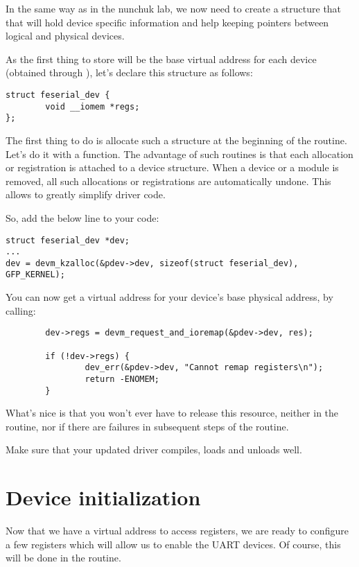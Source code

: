 In the same way as in the nunchuk lab, we now need to create a
structure that that will hold device specific information and help
keeping pointers between logical and physical devices.

As the first thing to store will be the base virtual address for
each device (obtained through ), let's declare this
structure as follows:

\begin{verbatim}
struct feserial_dev {
        void __iomem *regs;
};
\end{verbatim}

The first thing to do is allocate such a structure at the beginning
of the  routine. Let's do it with a  function.
The advantage of such routines is that each allocation or registration
is attached to a device structure. When a device or a module is removed,
all such allocations or registrations are automatically undone. This
allows to greatly simplify driver code.

So, add the below line to your code:

\begin{verbatim}
struct feserial_dev *dev;
...
dev = devm_kzalloc(&pdev->dev, sizeof(struct feserial_dev), GFP_KERNEL);
\end{verbatim}

You can now get a virtual address for your device's base physical
address, by calling:

\begin{verbatim}
        dev->regs = devm_request_and_ioremap(&pdev->dev, res);

        if (!dev->regs) {
                dev_err(&pdev->dev, "Cannot remap registers\n");
                return -ENOMEM;
        }
\end{verbatim}

What's nice is that you won't ever have to release this resource,
neither in the  routine, nor if there are failures
in subsequent steps of the  routine.

Make sure that your updated driver compiles, loads and unloads well.

\section{Device initialization}

Now that we have a virtual address to access registers, we are ready to
configure a few registers which will allow us to enable the UART
devices. Of course, this will be done in the  routine.

